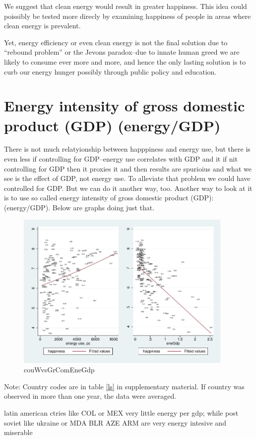 \documentclass[10pt, letterpaper]{article}
\begin{document}
\begin{spacing}{1.4}
We suggest that clean energy would result in greater happiness. This idea could
poissibly be tested more direcly by examining happiness of people in areas where
clean energy is prevalent. 


Yet, energy efficiency or even clean energy is not the final solution due to
``rebound problem'' or the Jevons paradox--due to innate human greed we are
likely to consume ever more and more, and hence the only lasting solution is to
curb our energy hunger possibly through public policy and education.

\section{Energy intensity of gross domestic product (GDP) (energy/GDP)}

There is not much relatyionship between happpiness and energy use, but there is
even less if controlling for GDP--energy use correlates with GDP and it if nit
controlling for GDP then it proxies it and then results are spurioius and what
we see is the effect of GDP, not energy use.  
To alleviate that problem we could have controlled for GDP. But we can do it
another way, too. 
Another way to look at it is to use so called energy intensity of gross domestic
product (GDP): (energy/GDP). Below  are graphs doing just that.


\begin{figure}[H]
 \includegraphics[height=3in]{graphsAndTables/couWvsGrComEneGdp.pdf}\centering
\caption{couWvsGrComEneGdp}\label{couWvsGrComEneGdp}
\end{figure}
{\scriptsize Note: Country codes are in table \ref{ls} in supplementary
  material. If country was observed in more than one year, the data were averaged.}

latin american ctries like COL or MEX very little energy per gdp; while post
soviet like ukraine or MDA BLR AZE ARM are very energy intesive and miserable


\end{spacing}
\end{document}
